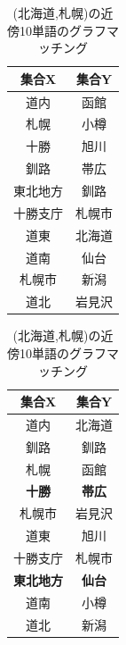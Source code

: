 \begin{table}[!h]
  \begin{minipage}[t]{.45\textwidth}
    \caption[(北海道,札幌)の近傍10単語]{(北海道,札幌)の近傍10単語}
    \label{}
    \begin{center}
      \begin{tabular}{|c||c|} \hline
        集合X & 集合Y \\ \hline \hline
        道内 & 函館 \\
        札幌 & 小樽 \\
        十勝 & 旭川 \\
        釧路 & 帯広 \\
        東北地方 & 釧路 \\
        十勝支庁 & 札幌市 \\
        道東 & 北海道 \\
        道南 & 仙台 \\
        札幌市 & 新潟 \\
        道北 & 岩見沢 \\ \hline
      \end{tabular}
    \end{center}
  \end{minipage}
  \hfill
  \begin{minipage}[t]{.45\textwidth}
    \caption[(北海道,札幌)の近傍10単語のグラフマッチング]{(北海道,札幌)の近傍10単語のグラフマッチング}
    \label{}
    \begin{center}
      \begin{tabular}{|c||c|} \hline
        集合X & 集合Y \\ \hline \hline
        道内 & 北海道 \\
        釧路 & 釧路 \\
        札幌 & 函館 \\
        \textbf{十勝} & \textbf{帯広} \\
        札幌市 & 岩見沢 \\
        道東 & 旭川 \\
        十勝支庁 & 札幌市 \\
        \textbf{東北地方} & \textbf{仙台} \\
        道南 & 小樽 \\
        道北 & 新潟 \\ \hline
      \end{tabular}
    \end{center}
  \end{minipage}
\end{table}

